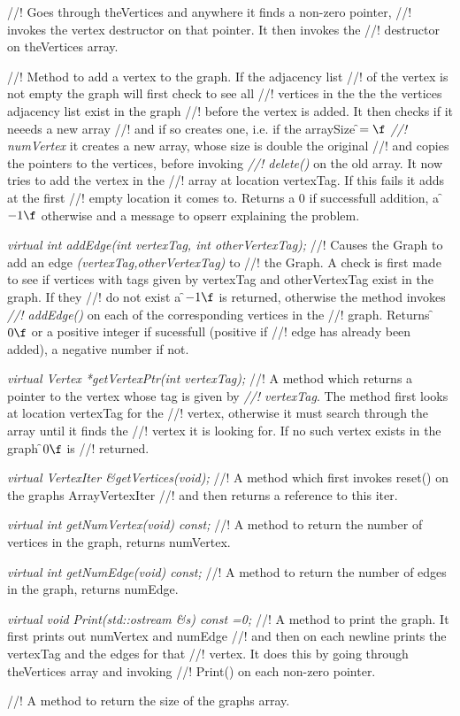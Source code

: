 //! Goes through \p theVertices and anywhere it finds a non-zero pointer,
//! invokes the vertex destructor on that pointer. It then invokes the
//! destructor on theVertices array.


//! Method to add a vertex to the graph. If the adjacency list
//! of the vertex is not empty the graph will first check to see all
//! vertices in the the the vertices adjacency list exist in the graph
//! before the vertex is added. It then checks if it neeeds a new array
//! and if so creates one, i.e. if the \p arraySize \f$=\f$ {\em
//! numVertex} it creates a new array, whose size is double the original
//! and copies the pointers to the vertices, before invoking {\em
//! delete()} on the old array. It now tries to add the vertex in the
//! array at location \p vertexTag. If this fails it adds at the first
//! empty location it comes to. Returns a 0 if successfull addition, a
\f$-1\f$ otherwise and a message to opserr explaining the problem. 

{\em virtual int addEdge(int vertexTag, int otherVertexTag); }
//! Causes the Graph to add an edge {\em (vertexTag,otherVertexTag)} to
//! the Graph. A check is first made to see if vertices with tags given by
\p vertexTag and \p otherVertexTag exist in the graph. If they
//! do not exist a \f$-1\f$ is returned, otherwise the method invokes {\em
//! addEdge()} on each of the corresponding vertices in the 
//! graph. Returns \f$0\f$ or a positive integer if sucessfull (positive if
//! edge has already been added), a negative number if not. 


{\em virtual Vertex *getVertexPtr(int vertexTag);}
//! A method which returns a pointer to the vertex whose tag is given by {\em
//! vertexTag}. The method first looks at location \p vertexTag for the
//! vertex, otherwise it must search through the array until it finds the
//! vertex it is looking for. If no such vertex exists in the graph \f$0\f$ is
//! returned. 

{\em virtual VertexIter \&getVertices(void);}
//! A method which first invokes reset() on the graphs ArrayVertexIter
//! and then returns a reference to this iter.

{\em virtual int getNumVertex(void) const;}
//! A method to return the number of vertices in the graph, returns numVertex.

{\em virtual int getNumEdge(void) const;}
//! A method to return the number of edges in the graph, returns numEdge.


{\em virtual void Print(std::ostream \&s) const =0;}
//! A method to print the graph. It first prints out numVertex and numEdge
//! and then on each newline prints the vertexTag and the edges for that
//! vertex. It does this by going through theVertices array and invoking
//! Print()  on each non-zero pointer.

//! A method to return the size of the graphs array.






